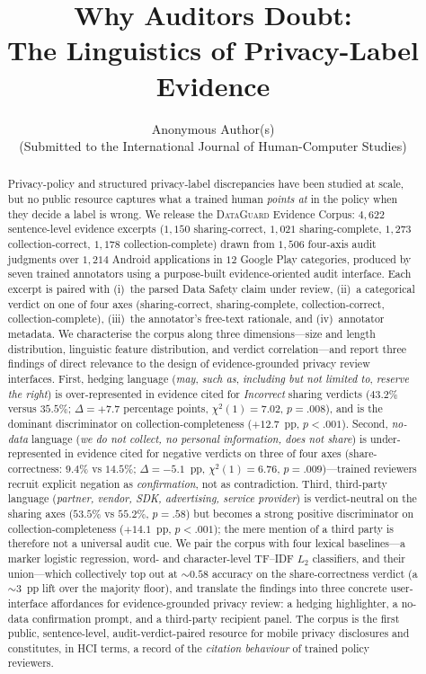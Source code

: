 \documentclass[11pt,a4paper]{article}
\title{\bfseries Why Auditors Doubt:\\
The Linguistics of Privacy-Label Evidence}
\author{Anonymous Author(s)\\\small (Submitted to the International Journal of Human-Computer Studies)}
\date{}
\newcommand{\dataguard}{\textsc{DataGuard}}
\begin{document}
\maketitle

\begin{abstract}
\noindent
Privacy-policy and structured privacy-label discrepancies have been
studied at scale, but no public resource captures what a trained human
\emph{points at} in the policy when they decide a label is wrong. We
release the \dataguard{} Evidence Corpus: $4{,}622$ sentence-level
evidence excerpts ($1{,}150$ sharing-correct, $1{,}021$ sharing-complete,
$1{,}273$ collection-correct, $1{,}178$ collection-complete) drawn from
$1{,}506$ four-axis audit judgments over $1{,}214$ Android applications
in $12$ Google Play categories, produced by seven trained annotators
using a purpose-built evidence-oriented audit interface. Each excerpt is
paired with (i)~the parsed Data Safety claim under review, (ii)~a
categorical verdict on one of four axes (sharing-correct,
sharing-complete, collection-correct, collection-complete), (iii)~the
annotator's free-text rationale, and (iv)~annotator metadata. We
characterise the corpus along three dimensions---size and length
distribution, linguistic feature distribution, and verdict
correlation---and report three findings of direct relevance to the
design of evidence-grounded privacy review interfaces. First, hedging
language (\emph{may}, \emph{such as}, \emph{including but not limited
to}, \emph{reserve the right}) is over-represented in evidence cited
for \emph{Incorrect} sharing verdicts ($43.2\%$ versus $35.5\%$;
$\Delta=+7.7$ percentage points, $\chi^{2}(1)=7.02$, $p=.008$), and is
the dominant discriminator on collection-completeness ($+12.7$~pp,
$p<.001$). Second, \emph{no-data} language (\emph{we do not collect,
no personal information, does not share}) is under-represented in
evidence cited for negative verdicts on three of four axes
(share-correctness: $9.4\%$ vs $14.5\%$; $\Delta=-5.1$~pp,
$\chi^{2}(1)=6.76$, $p=.009$)---trained reviewers recruit explicit
negation as \emph{confirmation}, not as contradiction. Third,
third-party language (\emph{partner, vendor, SDK, advertising,
service provider}) is verdict-neutral on the sharing axes
($53.5\%$ vs $55.2\%$, $p=.58$) but becomes a strong positive
discriminator on collection-completeness ($+14.1$~pp, $p<.001$); the
mere mention of a third party is therefore not a universal audit cue. We pair the corpus with four lexical
baselines---a marker logistic regression, word- and character-level
TF--IDF $L_2$ classifiers, and their union---which collectively top
out at $\sim 0.58$ accuracy on the share-correctness verdict (a
$\sim 3$~pp lift over the majority floor), and translate the findings into
three concrete user-interface affordances for evidence-grounded
privacy review: a hedging highlighter, a no-data confirmation prompt,
and a third-party recipient panel. The corpus is the first public,
sentence-level, audit-verdict-paired resource for mobile privacy
disclosures and constitutes, in HCI terms, a record of the
\emph{citation behaviour} of trained policy reviewers.
\end{abstract}
\end{document}
